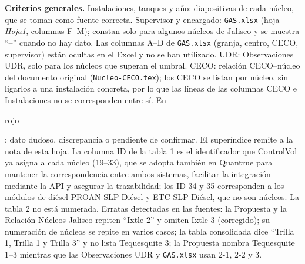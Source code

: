 \documentclass[10pt]{article}
\newcommand{\pendiente}[1]{{\setlength{\fboxsep}{0.6pt}\colorbox{red!25}{\strut #1}}}
\newcommand{\nt}[1]{\smash{\raisebox{0.45ex}{\fontsize{6}{6}\selectfont[#1]}}}
\begin{document}
\textbf{Criterios generales.}
Instalaciones, tanques y año: diapositivas de cada núcleo, que se toman como fuente correcta.
Supervisor y encargado: \texttt{GAS.xlsx} (hoja \emph{Hoja1}, columnas F--M); constan solo para algunos núcleos de Jalisco y se muestra ``--'' cuando no hay dato. Las columnas A--D de \texttt{GAS.xlsx} (granja, centro, CECO, supervisor) están ocultas en el Excel y no se han utilizado.
UDR: Observaciones UDR, solo para los núcleos que superan el umbral.
CECO: relación CECO--núcleo del documento original (\texttt{Nucleo-CECO.tex}); los CECO se listan por núcleo, sin ligarlos a una instalación concreta, por lo que las líneas de las columnas CECO e Instalaciones no se corresponden entre sí.
En \pendiente{rojo}: dato dudoso, discrepancia o pendiente de confirmar. El superíndice \nt{n} remite a la nota \nt{n} de esta hoja.
La columna ID de la tabla 1 es el identificador que ControlVol ya asigna a cada núcleo (19--33), que se adopta también en Quantrue para mantener la correspondencia entre ambos sistemas, facilitar la integración mediante la API y asegurar la trazabilidad; los ID 34 y 35 corresponden a los módulos de diésel PROAN SLP Diésel y ETC SLP Diésel, que no son núcleos. La tabla 2 no está numerada.
Erratas detectadas en las fuentes: la Propuesta y la Relación Núcleos Jalisco repiten ``Ixtle 2'' y omiten Ixtle 3 (corregido); su numeración de núcleos se repite en varios casos; la tabla consolidada dice ``Trilla 1, Trilla 1 y Trilla 3'' y no lista Tequesquite 3; la Propuesta nombra Tequesquite 1--3 mientras que las Observaciones UDR y \texttt{GAS.xlsx} usan 2-1, 2-2 y 3.
\end{document}
